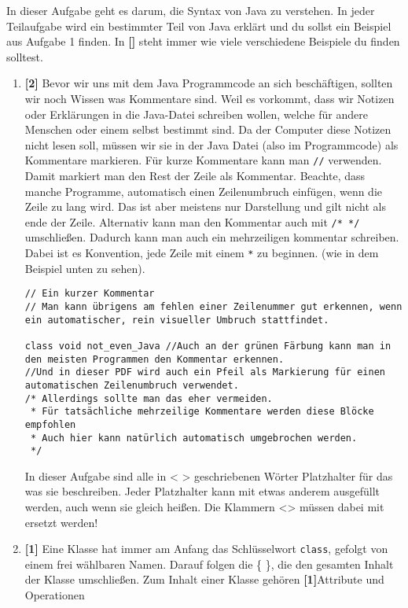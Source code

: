 
In dieser Aufgabe geht es darum, die Syntax von Java zu verstehen.
In jeder Teilaufgabe wird ein bestimmter Teil von Java erklärt und du sollst ein Beispiel aus Aufgabe 1 finden. In \textbf{[]} steht immer wie viele verschiedene Beispiele du finden solltest.

\begin{enumerate}
    \item \textbf{[2]} Bevor wir uns mit dem Java Programmcode an sich beschäftigen, sollten wir noch Wissen was Kommentare sind.
          Weil es vorkommt, dass wir Notizen oder Erklärungen in die Java-Datei schreiben wollen, welche für andere Menschen oder einem selbst bestimmt sind. Da der Computer diese Notizen nicht lesen soll, müssen wir sie in der Java Datei (also im Programmcode) als Kommentare markieren.
          Für kurze Kommentare kann man \lstinline[breaklines=false]{//} verwenden. Damit markiert man den Rest der Zeile als Kommentar. Beachte, dass manche Programme, automatisch einen Zeilenumbruch einfügen, wenn die Zeile zu lang wird.
          Das ist aber meistens nur Darstellung und gilt nicht als ende der Zeile.
          Alternativ kann man den Kommentar auch mit \lstinline[breaklines=false]{/* */} umschließen. Dadurch kann man auch ein mehrzeiligen kommentar schreiben. Dabei ist es Konvention, jede Zeile mit einem \textcolor{javagreen}{\texttt{*}} zu beginnen. (wie in dem Beispiel unten zu sehen).
          \begin{lstlisting}[title=\textbf{Kommentar Beispiel}]
// Ein kurzer Kommentar 
// Man kann übrigens am fehlen einer Zeilenummer gut erkennen, wenn ein automatischer, rein visueller Umbruch stattfindet.
    
class void not_even_Java //Auch an der grünen Färbung kann man in den meisten Programmen den Kommentar erkennen.
//Und in dieser PDF wird auch ein Pfeil als Markierung für einen automatischen Zeilenumbruch verwendet.
/* Allerdings sollte man das eher vermeiden.
 * Für tatsächliche mehrzeilige Kommentare werden diese Blöcke empfohlen
 * Auch hier kann natürlich automatisch umgebrochen werden.
 */
        \end{lstlisting}
          In dieser Aufgabe sind alle in < > geschriebenen Wörter Platzhalter für das was sie beschreiben. Jeder Platzhalter kann mit etwas anderem ausgefüllt werden, auch wenn sie gleich heißen. Die Klammern <> müssen dabei mit ersetzt werden!
    \item \textbf{[1]} Eine Klasse hat immer am Anfang das Schlüsselwort \lstinline{class}, gefolgt von einem frei wählbaren Namen. Darauf folgen die \{ \}, die den gesamten Inhalt der Klasse umschließen.
          Zum Inhalt einer Klasse gehören \textbf{[1]}Attribute und Operationen


\end{enumerate}
